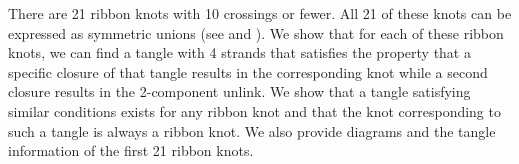 
\diagrams
\theorems

\begin{paperabs}
There are 21 ribbon knots with 10 crossings or fewer.
All 21 of these knots can be expressed as symmetric unions (see \cite{many} and
\cite{one}).
We show that for each of these ribbon knots, we can find a tangle with 4 strands
that satisfies the property that a specific closure of that tangle results in
the corresponding knot while a second closure results in the 2-component unlink.
We show that a tangle satisfying similar conditions exists for any ribbon knot
and that the knot corresponding to such a tangle is always a ribbon knot.
We also provide diagrams and the tangle information of the first 21 ribbon
knots.
\end{paperabs}
